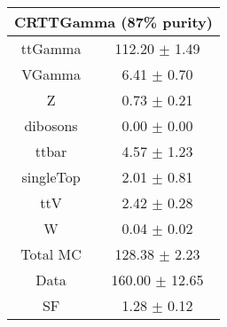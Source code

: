 \begin{tabular}{c|c}
\hline\hline
\multicolumn{2}{c}{\bf CRTTGamma (87\% purity)} \\ \hline 
ttGamma & 112.20 $\pm$ 1.49 \\
VGamma & 6.41 $\pm$ 0.70 \\
Z & 0.73 $\pm$ 0.21 \\
dibosons & 0.00 $\pm$ 0.00 \\
ttbar & 4.57 $\pm$ 1.23 \\
singleTop & 2.01 $\pm$ 0.81 \\
ttV & 2.42 $\pm$ 0.28 \\
W & 0.04 $\pm$ 0.02 \\
\hline
Total MC & 128.38 $\pm$ 2.23 \\
Data & 160.00 $\pm$ 12.65 \\
 \hline
SF & 1.28 $\pm$ 0.12 \\
\hline\hline
\end{tabular}
